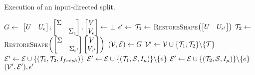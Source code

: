 \begin{algorithm}[h]
\small
\caption{Execution of an input-directed split.}\label{alg:appendix:in-split}
\begin{algorithmic}[1]
        \State $G \gets$
        \State $\begin{bmatrix}U & U_\epsilon\end{bmatrix},  \begin{bmatrix}\Sigma & \\ & \Sigma_\epsilon\end{bmatrix}, \begin{bmatrix}V \\ V_\epsilon\end{bmatrix} \gets$ 
            \State \Return $\bot$
        \EndIf
        \State $\epsilon' \gets$ 
        \State $\mathcal{T}_1 \gets$ \textsc{RestoreShape}$\left(\begin{bmatrix}U & U_{\epsilon'}\end{bmatrix}\right)$
        \State $\mathcal{T}_2 \gets$ \textsc{RestoreShape}$\left(\begin{bmatrix}\Sigma & \\ & \Sigma_{\epsilon'}\end{bmatrix} \begin{bmatrix}V \\ V_{\epsilon'}\end{bmatrix}\right)$
        \State $(\mathcal{V}, \mathcal{E}) \gets G$
        \State $\mathcal{V}' \gets \mathcal{V} \cup \{\mathcal{T}_1, \mathcal{T}_2\} \backslash \{\mathcal{T}\}$
        \State $\mathcal{E}' \gets \mathcal{E} \cup \{(\mathcal{T}_1, \mathcal{T}_2, I_{fresh})\}$
                    \State $\mathcal{E}' \gets \mathcal{E} \cup \{(\mathcal{T}_1, \mathcal{S}, I_\mu)\} \backslash \{e\}$
                \Else
                    \State $\mathcal{E}' \gets \mathcal{E} \cup \{(\mathcal{T}_2, \mathcal{S}, I_\mu)\} \backslash \{e\}$
                \EndIf
            \EndIf
        \EndFor
        \State \Return $(\mathcal{V}', \mathcal{E}'), \epsilon'$
    \EndFunction
\end{algorithmic}
\end{algorithm}

